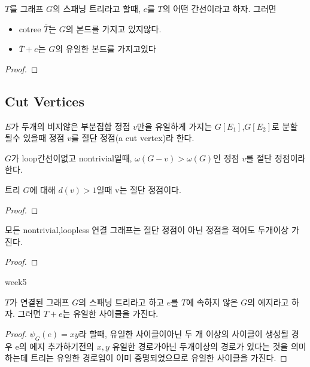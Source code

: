 \begin{theorem}
    $T$를 그래프 $G$의 스패닝 트리라고 할때, $e$를 $T$의 어떤 간선이라고 하자. 그러면
    \begin{itemize}
        \item cotree $\bar{T}$는 $G$의 본드를 가지고 있지않다.        
        \item $\bar{T}+e$는 $G$의 유일한 본드를 가지고있다
    \end{itemize}
\end{theorem}

\begin{proof}
    
\end{proof}

\subsection{Cut Vertices}

\begin{dfn}
    $E$가 두개의 비지않은 부분집합 정점 $v$만을 유일하게 가지는 $G[E_1]$,$G[E_2]$로 분할 될수 있을때 정점 $v$를 절단 정점(a cut vertex)라 한다.
    
    $G$가 loop간선이없고 nontrivial일때, $\omega(G-v) > \omega(G)$인 정점 $v$를 절단 정점이라 한다.
\end{dfn}

\begin{theorem}
    트리 $G$에 대해 $d(v) > 1$일때 v는 절단 정점이다.   
\end{theorem}

\begin{proof}
    
\end{proof}

\begin{corollary}
    모든 nontrivial,loopless 연결 그래프는 절단 정점이 아닌 정점을 적어도 두개이상 가진다.
\end{corollary}


\begin{proof}
    
\end{proof}

week5



\begin{theorem}
    $T$가 연결된 그래프 $G$의 스패닝 트리라고 하고 $e$를 $T$에 속하지 않은 $G$의 에지라고 하자. 그러면 $T + e$는 유일한 사이클을 가진다.
\end{theorem}
\begin{proof}
    $\psi_G(e) = xy$라 할때, 유일한 사이클이아닌 두 개 이상의 사이클이 생성될 경우  e의 에지 추가하기전의 $x, y$ 유일한 경로가아닌 두개이상의 경로가 있다는 것을 의미하는데 트리는 유일한 경로임이 이미 증명되었으므로 유일한 사이클을 가진다.
\end{proof}







